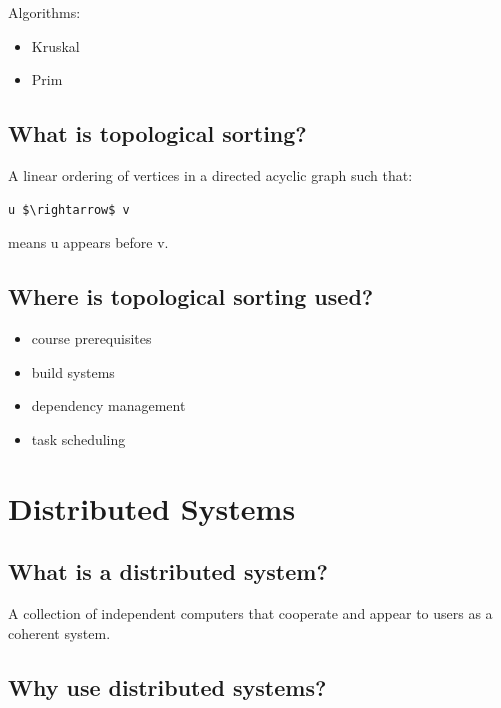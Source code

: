 Algorithms:

\begin{itemize}
  \item Kruskal
  \item Prim
\end{itemize}

\medskip

\subsection{What is topological sorting?}

A linear ordering of vertices in a directed acyclic graph such that:

\begin{lstlisting}
u $\rightarrow$ v
\end{lstlisting}

means u appears before v.

\medskip

\subsection{Where is topological sorting used?}

\begin{itemize}
  \item course prerequisites
  \item build systems
  \item dependency management
  \item task scheduling
\end{itemize}

\medskip

\section{Distributed Systems}

\subsection{What is a distributed system?}

A collection of independent computers that cooperate and appear to users as a coherent system.

\medskip

\subsection{Why use distributed systems?}

